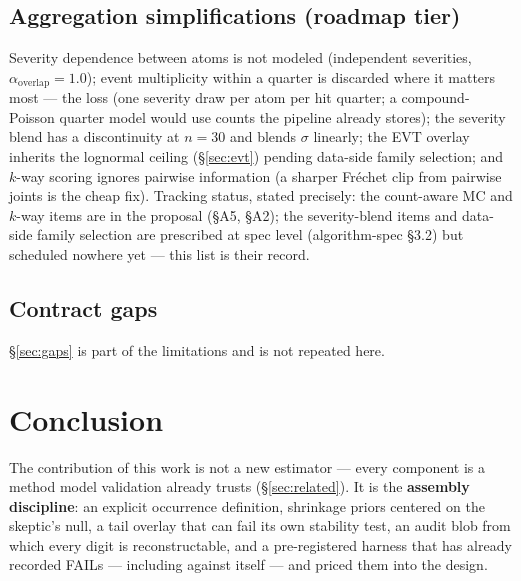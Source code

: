 \documentclass[11pt]{article}
\begin{document}
\subsection{Aggregation simplifications (roadmap tier)}
\label{sec:aggregation}

Severity dependence between atoms is not modeled (independent severities,
$\alpha_{\mathrm{overlap}} = 1.0$); event multiplicity within a quarter is
discarded where it matters most --- the loss (one severity draw per atom per
hit quarter; a compound-Poisson quarter model would use counts the pipeline
already stores); the severity blend has a discontinuity at $n = 30$ and
blends $\sigma$ linearly; the EVT overlay inherits the lognormal ceiling
(\S\ref{sec:evt}) pending data-side family selection; and $k$-way scoring
ignores pairwise information (a sharper Fr\'echet clip from pairwise joints
is the cheap fix). Tracking status, stated precisely: the count-aware MC and
$k$-way items are in the proposal (\S A5, \S A2); the severity-blend items
and data-side family selection are prescribed at spec level (algorithm-spec
\S3.2) but scheduled nowhere yet --- this list is their record.

\subsection{Contract gaps}
\S\ref{sec:gaps} is part of the limitations and is not repeated here.

\section{Conclusion}
\label{sec:conclusion}

The contribution of this work is not a new estimator --- every component is
a method model validation already trusts (\S\ref{sec:related}). It is the
\textbf{assembly discipline}: an explicit occurrence definition, shrinkage
priors centered on the skeptic's null, a tail overlay that can fail its own
stability test, an audit blob from which every digit is reconstructable, and
a pre-registered harness that has already recorded FAILs --- including
against itself --- and priced them into the design.
\end{document}

